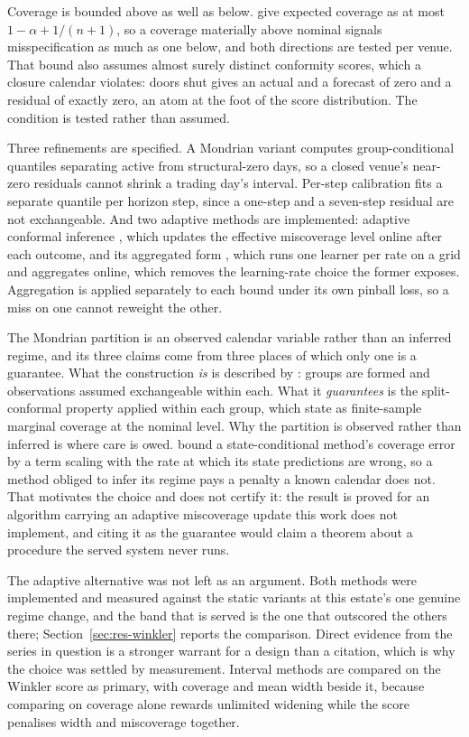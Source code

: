 Coverage is bounded above as well as below. \citet{angelopoulos_conformal_2023} give expected
coverage as at most $1-\alpha + 1/(n+1)$, so a coverage materially above nominal signals
misspecification as much as one below, and both directions are tested per venue. That bound also
assumes almost surely distinct conformity scores, which a closure calendar violates: doors shut
gives an actual and a forecast of zero and a residual of exactly zero, an atom at the foot of the
score distribution. The condition is tested rather than assumed.

Three refinements are specified. A Mondrian variant computes group-conditional quantiles
separating active from structural-zero days, so a closed venue's near-zero residuals cannot shrink
a trading day's interval. Per-step calibration fits a separate quantile per horizon step, since a
one-step and a seven-step residual are not exchangeable. And two adaptive methods are implemented:
adaptive conformal inference \citep{gibbs_adaptive_2021}, which updates the effective miscoverage
level online after each outcome, and its aggregated form \citep{zaffran_adaptive_2022}, which runs
one learner per rate on a grid and aggregates online, which removes the learning-rate choice the
former exposes. Aggregation is applied separately to each bound under its own pinball loss, so a
miss on one cannot reweight the other.

The Mondrian partition is an observed calendar variable rather than an inferred regime, and its
three claims come from three places of which only one is a guarantee. What the construction
\emph{is} is described by \citet{barber_conformal_2023}: groups are formed and observations
assumed exchangeable within each. What it \emph{guarantees} is the split-conformal property
applied within each group, which \citet{stocker_gentle_2025} state as finite-sample marginal
coverage at the nominal level. Why the partition is observed rather than inferred is where care is
owed. \citet{sun_conformal_2025} bound a state-conditional method's coverage error by a term
scaling with the rate at which its state predictions are wrong, so a method obliged to infer its
regime pays a penalty a known calendar does not. That motivates the choice and does not certify
it: the result is proved for an algorithm carrying an adaptive miscoverage update this work does
not implement, and citing it as the guarantee would claim a theorem about a procedure the served
system never runs.

The adaptive alternative was not left as an argument. Both methods were implemented and measured
against the static variants at this estate's one genuine regime change, and the band that is
served is the one that outscored the others there; Section~\ref{sec:res-winkler} reports the
comparison. Direct evidence from the series in question is a stronger warrant for a design than a
citation, which is why the choice was settled by measurement. Interval methods are compared on the
Winkler score as primary, with
coverage and mean width beside it, because comparing on coverage alone rewards unlimited widening
while the score penalises width and miscoverage together.

